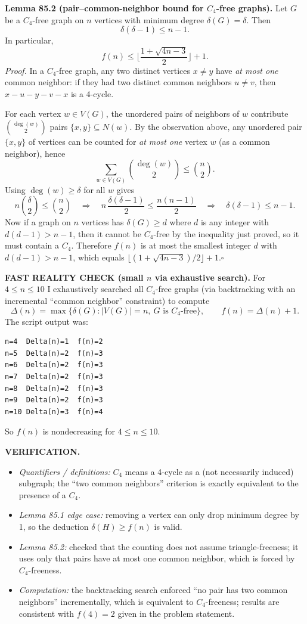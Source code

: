 \smallskip
\noindent\textbf{Lemma 85.2 (pair--common-neighbor bound for $C_4$-free graphs).}
Let $G$ be a $C_4$-free graph on $n$ vertices with minimum degree $\delta(G)=\delta$. Then
\[
\delta(\delta-1)\le n-1.
\]
In particular,
\[
 f(n)\le \Big\lfloor \frac{1+\sqrt{4n-3}}{2}\Big\rfloor+1.
\]
\textit{Proof.}
In a $C_4$-free graph, any two distinct vertices $x\ne y$ have \emph{at most one} common neighbor: if they had two distinct common neighbors $u\ne v$, then $x-u-y-v-x$ is a 4-cycle.

For each vertex $w\in V(G)$, the unordered pairs of neighbors of $w$ contribute $\binom{\deg(w)}{2}$ pairs $\{x,y\}\subseteq N(w)$. By the observation above, any unordered pair $\{x,y\}$ of vertices can be counted for \emph{at most one} vertex $w$ (as a common neighbor), hence
\[
\sum_{w\in V(G)} \binom{\deg(w)}{2} \le \binom{n}{2}.
\]
Using $\deg(w)\ge \delta$ for all $w$ gives
\[
 n\binom{\delta}{2} \le \binom{n}{2}
 \quad\Rightarrow\quad
 n\,\frac{\delta(\delta-1)}{2} \le \frac{n(n-1)}{2}
 \quad\Rightarrow\quad
 \delta(\delta-1)\le n-1.
\]
Now if a graph on $n$ vertices has $\delta(G)\ge d$ where $d$ is any integer with $d(d-1)>n-1$, then it cannot be $C_4$-free by the inequality just proved, so it must contain a $C_4$. Therefore $f(n)$ is at most the smallest integer $d$ with $d(d-1)>n-1$, which equals $\lfloor(1+\sqrt{4n-3})/2\rfloor+1$.\hfill $\square$

\smallskip
\noindent\textbf{FAST REALITY CHECK (small $n$ via exhaustive search).}
For $4\le n\le 10$ I exhaustively searched all $C_4$-free graphs (via backtracking with an incremental ``common neighbor'' constraint) to compute
\[
\Delta(n)=\max\{\delta(G): |V(G)|=n,\ G\text{ is }C_4\text{-free}\},\qquad f(n)=\Delta(n)+1.
\]
The script output was:
\begin{verbatim}
n=4  Delta(n)=1  f(n)=2
n=5  Delta(n)=2  f(n)=3
n=6  Delta(n)=2  f(n)=3
n=7  Delta(n)=2  f(n)=3
n=8  Delta(n)=2  f(n)=3
n=9  Delta(n)=2  f(n)=3
n=10 Delta(n)=3  f(n)=4
\end{verbatim}
So $f(n)$ is nondecreasing for $4\le n\le 10$.

\medskip
\noindent\textbf{VERIFICATION.}
\begin{itemize}
\item \emph{Quantifiers / definitions:} $C_4$ means a 4-cycle as a (not necessarily induced) subgraph; the ``two common neighbors'' criterion is exactly equivalent to the presence of a $C_4$.
\item \emph{Lemma 85.1 edge case:} removing a vertex can only drop minimum degree by 1, so the deduction $\delta(H)\ge f(n)$ is valid.
\item \emph{Lemma 85.2:} checked that the counting does not assume triangle-freeness; it uses only that pairs have at most one common neighbor, which is forced by $C_4$-freeness.
\item \emph{Computation:} the backtracking search enforced ``no pair has two common neighbors'' incrementally, which is equivalent to $C_4$-freeness; results are consistent with $f(4)=2$ given in the problem statement.
\end{itemize}

